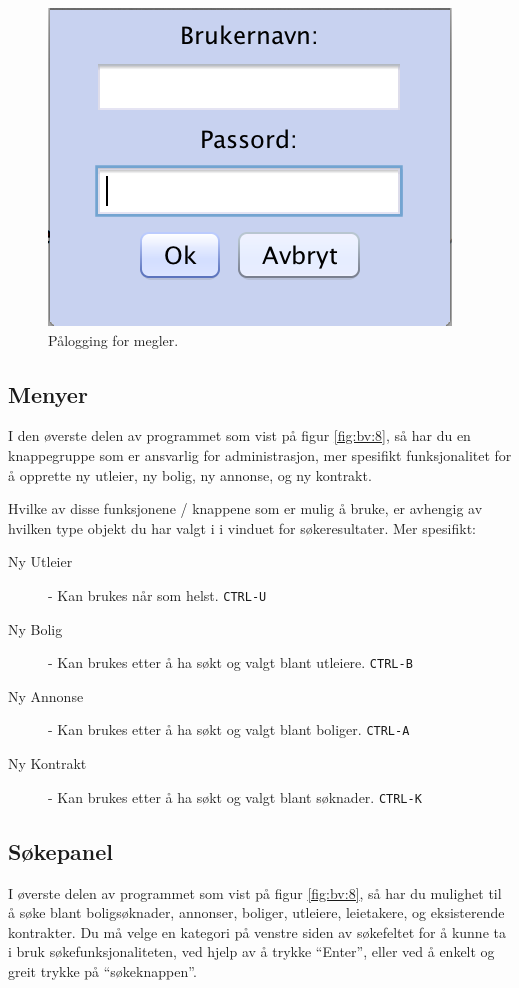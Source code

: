 \begin{figure}[h!]
\center
 \includegraphics[scale=0.7]{./img/brukerveiledning/7.png}
 \caption{Pålogging for megler.}
 \label{fig:bv:7}
\end{figure}




\newpage
\subsection{Menyer}
I den øverste delen av programmet som vist på figur \ref{fig:bv:8}, så har du en knappegruppe som er ansvarlig
for administrasjon, mer spesifikt funksjonalitet for å opprette ny utleier, ny bolig, ny annonse, og
 ny kontrakt.

Hvilke av disse funksjonene / knappene som er mulig å bruke, er avhengig av hvilken type
objekt du har valgt i i vinduet for søkeresultater. Mer spesifikt:

\begin{description}
\item[Ny Utleier] -
Kan brukes når som helst. \texttt{CTRL-U}
\item[Ny Bolig] -
Kan brukes etter å ha søkt og valgt blant utleiere. \texttt{CTRL-B}
\item[Ny Annonse] -
Kan brukes etter å ha søkt og valgt blant boliger. \texttt{CTRL-A}
\item[Ny Kontrakt] -
Kan brukes etter å ha søkt og valgt blant søknader. \texttt{CTRL-K}
\end{description}





\subsection{Søkepanel}
I øverste delen av programmet som vist på figur \ref{fig:bv:8}, så har du mulighet til å søke blant
boligsøknader, annonser, boliger, utleiere, leietakere, og eksisterende kontrakter.
Du må velge en kategori på venstre siden av søkefeltet for å kunne ta i bruk søkefunksjonaliteten,
ved hjelp av å trykke “Enter”, eller ved å enkelt og greit trykke på “søkeknappen”.


